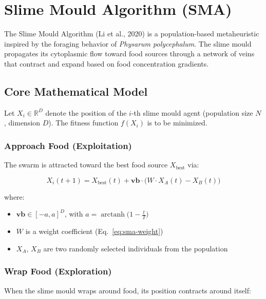 \documentclass[12pt,a4paper,oneside]{report}
\begin{document}
\section{Slime Mould Algorithm (SMA)}

The Slime Mould Algorithm (Li et al., 2020) is a population-based metaheuristic inspired by the foraging behavior of \textit{Physarum polycephalum}. The slime mould propagates its cytoplasmic flow toward food sources through a network of veins that contract and expand based on food concentration gradients.

\subsection{Core Mathematical Model}

Let $X_i \in \mathbb{R}^D$ denote the position of the $i$-th slime mould agent (population size $N$, dimension $D$). The fitness function $f(X_i)$ is to be minimized.

\subsubsection{Approach Food (Exploitation)}

The swarm is attracted toward the best food source $X_{\text{best}}$ via:

\begin{equation}\label{eq:sma-position}
X_i(t+1) = X_{\text{best}}(t) + \mathbf{vb} \cdot \bigl( W \cdot X_A(t) - X_B(t) \bigr)
\end{equation}

where:
\begin{itemize}
    \item $\mathbf{vb} \in [-a, a]^D$, with $a = \operatorname{arctanh}\bigl(1 - \frac{t}{T}\bigr)$
    \item $W$ is a weight coefficient (Eq.~\ref{eq:sma-weight})
    \item $X_A$, $X_B$ are two randomly selected individuals from the population
\end{itemize}

\subsubsection{Wrap Food (Exploration)}

When the slime mould wraps around food, its position contracts around itself:
\end{document}
